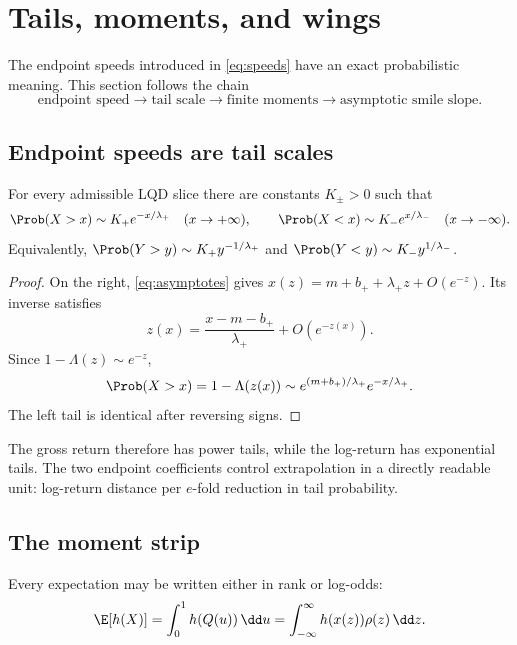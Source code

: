 \section{Tails, moments, and wings}
\label{sec:tails}

The endpoint speeds introduced in \eqref{eq:speeds} have an exact
probabilistic meaning.  This section follows the chain
\[
\text{endpoint speed}\longrightarrow
\text{tail scale}\longrightarrow
\text{finite moments}\longrightarrow
\text{asymptotic smile slope}.
\]

\subsection{Endpoint speeds are tail scales}

\begin{proposition}
\label{prop:tails}
For every admissible LQD slice there are constants $K_\pm>0$ such that
\begin{equation}
\Prob(X>x)\sim K_+e^{-x/\lambda_+}\quad(x\to+\infty),
\qquad
\Prob(X<x)\sim K_-e^{x/\lambda_-}\quad(x\to-\infty).
\label{eq:exptails}
\end{equation}
Equivalently,
$\Prob(Y>y)\sim K_+y^{-1/\lambda_+}$ and
$\Prob(Y<y)\sim K_-y^{1/\lambda_-}$.
\end{proposition}

\begin{proof}
On the right, \eqref{eq:asymptotes} gives
$x(z)=m+b_++\lambda_+z+O(e^{-z})$.  Its inverse satisfies
\[
z(x)=\frac{x-m-b_+}{\lambda_+}+O(e^{-z(x)}).
\]
Since $1-\Lambda(z)\sim e^{-z}$,
\[
\Prob(X>x)=1-\Lambda(z(x))
\sim e^{(m+b_+)/\lambda_+}e^{-x/\lambda_+}.
\]
The left tail is identical after reversing signs.
\end{proof}

The gross return therefore has power tails, while the log-return has
exponential tails.  The two endpoint coefficients control extrapolation in a
directly readable unit: log-return distance per $e$-fold reduction in tail
probability.

\subsection{The moment strip}

Every expectation may be written either in rank or log-odds:
\begin{equation}
\E[h(X)]=\int_0^1h(Q(u))\,\dd u
=\int_{-\infty}^{\infty}h(x(z))\rho(z)\,\dd z.
\label{eq:rankintegral}
\end{equation}


